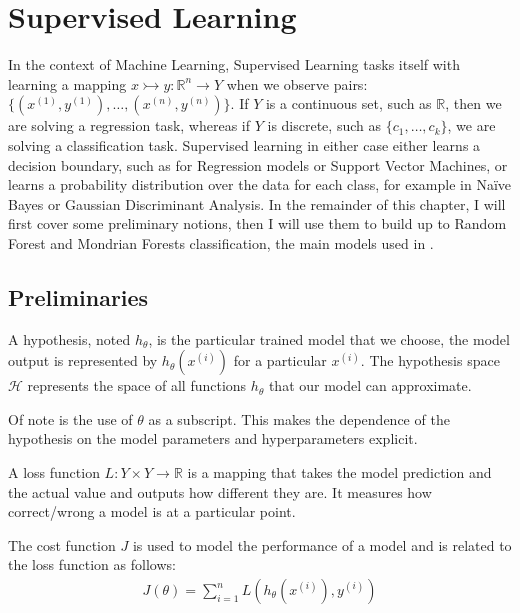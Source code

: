 \chapter{Supervised Learning}
\label{appendix:supervised}

In the context of Machine Learning, Supervised Learning tasks itself with
learning a mapping $x \rightarrowtail y: \mathbb{R}^n \rightarrow Y$ when we
observe pairs: $\{(x^{(1)}, y^{(1)}),\dots,(x^{(n)}, y^{(n)})\}$. If $Y$ is a
continuous set, such as $\mathbb{R}$, then we are solving a regression task,
whereas if $Y$ is discrete, such as $\{c_1, \dots, c_k\}$, we are solving a
classification task. Supervised learning in either case either learns a decision
boundary, such as for Regression models or Support Vector Machines, or learns a
probability distribution over the data for each class, for example in Na\"ive
Bayes or Gaussian Discriminant Analysis. In the remainder of this chapter, I
will first cover some preliminary notions, then I will use them to build up to
Random Forest and Mondrian Forests classification, the main models used in
.

\section{Preliminaries}
\label{appendix:supervised:prelim}

\begin{definition}
    A hypothesis, noted $h_{\theta}$, is the particular trained model that we
    choose, the model output is represented by $h_{\theta}(x^{(i)})$ for a
    particular $x^{(i)}$. The hypothesis space $\mathcal{H}$ represents the
    space of all functions $h_{\theta}$ that our model can approximate.
\end{definition}
%
\noindent Of note is the use of $\theta$ as a subscript. This makes the
dependence of the hypothesis on the model parameters and hyperparameters
explicit.

\begin{definition}
    A loss function $L: Y \times Y \rightarrow \mathbb{R}$ is a mapping that
    takes the model prediction and the actual value and outputs how different
    they are. It measures how correct/wrong a model is at a particular point.
    
\end{definition}

\begin{definition}
    The cost function $J$ is used to model the performance of a model and is
    related to the loss function as follows:
    \begin{align}
        J(\theta) = \sum_{i=1}^{n}L(h_{\theta}(x^{(i)}), y^{(i)})
    \end{align}
\end{definition}

